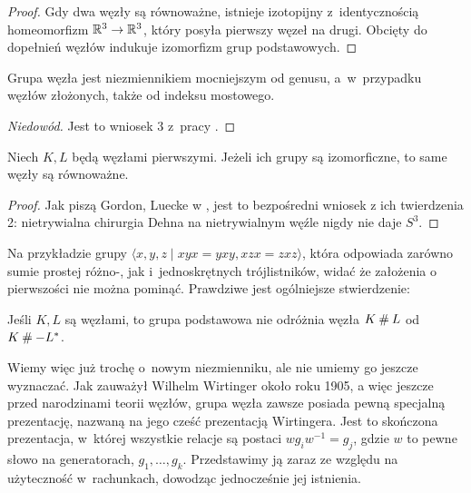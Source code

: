 \begin{proof}
    Gdy dwa węzły są równoważne, istnieje izotopijny z~identycznością homeomorfizm $\mathbb R^3 \to \mathbb R^3$, który posyła pierwszy węzeł na drugi.
    Obcięty do dopełnień węzłów indukuje izomorfizm grup podstawowych.
\end{proof}

\begin{proposition}
    Grupa węzła jest niezmiennikiem mocniejszym od genusu, a~w~przypadku węzłów złożonych, także od indeksu mostowego.
\end{proposition}

\begin{proof}[Niedowód]
    Jest to wniosek 3 z~pracy \cite{feustel78}.
\end{proof}

\begin{proposition}
    Niech $K, L$ będą węzłami pierwszymi.
    Jeżeli ich grupy są izomorficzne, to same węzły są równoważne.
\end{proposition}

\begin{proof}
    Jak piszą Gordon, Luecke w \cite{gordon89}, jest to bezpośredni wniosek z ich twierdzenia 2: nietrywialna chirurgia Dehna na nietrywialnym węźle nigdy nie daje $S^3$.
\end{proof}

Na przykładzie grupy $\langle x,y,z \mid xyx=yxy,xzx=zxz\rangle$, która odpowiada zarówno sumie prostej różno-, jak i~jednoskrętnych trójlistników, widać że założenia o pierwszości nie można pominąć.
Prawdziwe jest ogólniejsze stwierdzenie:

\begin{proposition}
    \label{prop:knot_group_sum}
    Jeśli $K, L$ są węzłami, to grupa podstawowa nie odróżnia węzła $K \mathbin{\#} L$ od $K \mathbin{\#} -L^*$.
\end{proposition}

Wiemy więc już trochę o~nowym niezmienniku, ale nie umiemy go jeszcze wyznaczać.
Jak zauważył Wilhelm Wirtinger około roku 1905, a więc jeszcze przed narodzinami teorii węzłów, grupa węzła zawsze posiada pewną specjalną prezentację, nazwaną na jego cześć prezentacją Wirtingera.
Jest to skończona prezentacja, w~której wszystkie relacje są postaci $w g_i w^{-1} = g_j$, gdzie $w$ to pewne słowo na generatorach, $g_1, \ldots, g_k$.
Przedstawimy ją zaraz ze względu na użyteczność w~rachunkach, dowodząc jednocześnie jej istnienia.

